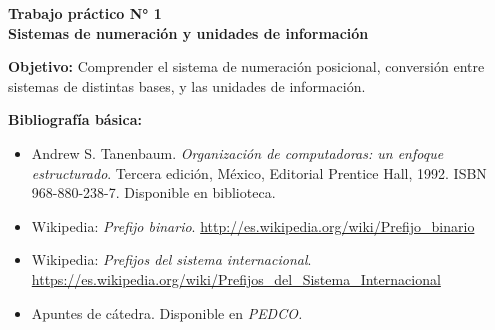 \documentclass[12pt]{article}
\def\maketitle{

\makeatletter
{\color{bl} \centering \huge \sc \textbf{ Trabajo práctico N° 1\\ \large
\vspace*{-8pt} \color{black} Sistemas de numeración y unidades de información \vspace*{8pt} }\par}
\makeatother

\makeatletter


}
\begin{document}
\thispagestyle{empty}
\maketitle
\setlength{\parindent}{1pt}

\textbf{Objetivo:} Comprender el sistema de numeración posicional, conversión
entre sistemas de distintas bases, y las unidades de información.

\textbf{Bibliografía básica:}

\vspace{-2\topsep}
\begin{itemize}

    \itemsep2pt \parskip0pt 

    \item   Andrew S. Tanenbaum. \emph{Organización de computadoras: un
        enfoque estructurado}. Tercera edición, México, Editorial Prentice
        Hall, 1992. ISBN 968-880-238-7. Disponible en biblioteca.

    \item   Wikipedia: \emph{Prefijo binario}.
        \url{http://es.wikipedia.org/wiki/Prefijo_binario}

    \item   Wikipedia: \emph{Prefijos del sistema internacional}.
        \url{https://es.wikipedia.org/wiki/Prefijos_del_Sistema_Internacional}

\item   Apuntes de cátedra. Disponible en \it{PEDCO}.

\end{itemize}

\end{document}
